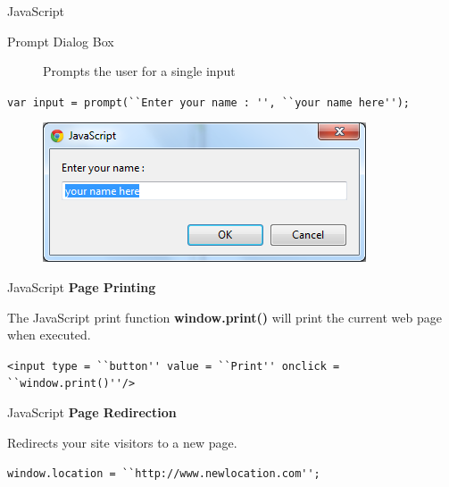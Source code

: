 \documentclass[14pt]{beamer}
\begin{document}
\begin{frame}{JavaScript}
\begin{description}
 \item [Prompt Dialog Box] Prompts the user for a single input
\end{description}
\begin{block}{}
\lstinline!var input = prompt(``Enter your name : '', ``your name here'');!
\end{block}
\begin{figure}[H]
\centering
\includegraphics[scale=.4]{prompt-box.png}
\end{figure}
\end{frame}

\begin{frame}{JavaScript}
\textbf{Page Printing}

\vspace{1pc}
The JavaScript print function \textbf{window.print()} will print the current web page when executed.

\begin{block}{}
\lstinline!<input type = ``button'' value = ``Print'' onclick = ``window.print()''/>!
\end{block}
\end{frame}

\begin{frame}{JavaScript}
\textbf{Page Redirection}

\vspace{1pc}
Redirects your site visitors to a new page.
\begin{block}{}
\lstinline!window.location = ``http://www.newlocation.com'';!
\end{block}
\end{frame}
\end{document}

